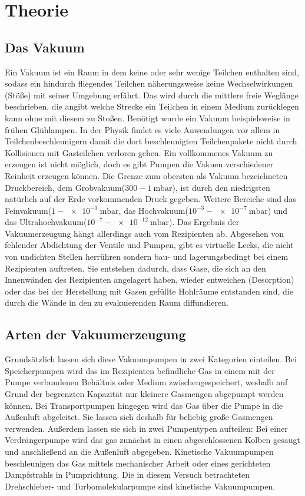 
\section{Theorie}
\label{sec:Theorie}

\subsection{Das Vakuum}

Ein Vakuum ist ein Raum in dem keine oder sehr wenige Teilchen enthalten sind, sodass ein hindurch fliegendes Teilchen näherungsweise keine Wechselwirkungen (Stöße) mit seiner Umgebung erfährt. Das wird durch die mittlere freie Weglänge beschrieben, die angibt welche Strecke ein Teilchen in einem Medium zurücklegen kann ohne mit diesem zu Stoßen. Benötigt wurde ein Vakuum beispielsweise in frühen Glühlampen. In der Physik findet es viele Anwendungen vor allem in Teilchenbeschleunigern damit die dort beschleunigten Teilchenpakete nicht durch Kollisionen mit Gasteilchen verloren gehen.
Ein vollkommenes Vakuum zu erzeugen ist nicht möglich, doch es gibt Pumpen die Vakuen verschiedener Reinheit erzeugen können. Die Grenze zum obersten als Vakuum bezeichneten Druckbereich, dem Grobvakuum($300 - \SI{1}{\milli\bar}$), ist durch den niedrigsten natürlich auf der Erde vorkommenden Druck gegeben. Weitere Bereiche sind das Feinvakuum($1 - \SI{e-3}{\milli\bar}$, das Hochvakuum($10^{-3} - \SI{e-7}{\milli\bar}$) und das Ultrahochvakuum($10^{-7} - \SI{e-12}{\milli\bar}$). Das Ergebnis der Vakuumerzeugung hängt allerdings auch vom Rezipienten ab. Abgesehen von fehlender Abdichtung der Ventile und Pumpen, gibt es virtuelle Lecks, die nicht von undichten Stellen herrühren sondern bau- und lagerungsbedingt bei einem Rezipienten auftreten. Sie entstehen dadurch, dass Gase, die sich an den Innenwänden des Rezipienten angelagert haben, wieder entweichen (Desorption) oder das bei der Herstellung mit Gasen gefüllte Hohlräume entstanden sind, die durch die Wände in den zu evakuierenden Raum diffundieren.
\subsection{Arten der Vakuumerzeugung}

Grundsätzlich lassen sich diese Vakuumpumpen in zwei Kategorien einteilen.
Bei Speicherpumpen wird das im Rezipienten befindliche Gas in einem mit der Pumpe verbundenen Behältnis oder Medium zwischengespeichert, weshalb auf Grund der begrenzten Kapazität nur kleinere Gasmengen abgepumpt werden können.
Bei Transportpumpen hingegen wird das Gas über die Pumpe in die Außenluft abgeleitet. Sie lassen sich deshalb für beliebig große Gasmengen verwenden.\cite{Jena} 
Außerdem lassen sie sich in zwei Pumpentypen aufteilen:\newline
Bei einer Verdrängerpumpe wird das gas zunächst in einen abgeschlossenen Kolben gesaugt und anschließend an die Außenluft abgegeben.\newline
Kinetische Vakuumpumpen beschleunigen das Gas mittels mechanischer Arbeit oder eines gerichteten Dampfstrahls in Pumprichtung\cite{Pfeiffer}.
Die in diesem Versuch betrachteten Drehschieber- und Turbomolekularpumpe sind kinetische Vakuumpumpen.

